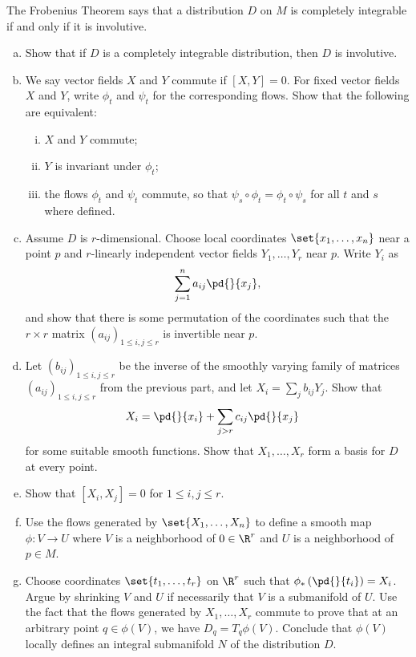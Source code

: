 \documentclass[10pt]{mypackage}
\begin{document}
\begin{problem}[Problem 3]
  The Frobenius Theorem says that a distribution $D$ on $M$ is completely integrable if and only if it is involutive.
  \begin{enumerate}[(a)]
    \item Show that if $D$ is a completely integrable distribution, then $D$ is involutive.
    \item We say vector fields $X$ and $Y$ commute if $ \left[ X,Y \right] = 0 $. For fixed vector fields $X$ and $Y$, write $\phi_t$ and $\psi_t$ for the corresponding flows. Show that the following are equivalent:
      \begin{enumerate}[(i)]
        \item $X$ and $Y$ commute;
        \item $Y$ is invariant under $\phi_t$;
        \item the flows $\phi_t$ and $\psi_t$ commute, so that $\psi_s\circ \phi_t = \phi_t\circ \psi_s$ for all $t$ and $s$ where defined.
      \end{enumerate}
    \item Assume $D$ is $r$-dimensional. Choose local coordinates $\set{x_1,\dots,x_n}$ near a point $p$ and $r$-linearly independent vector fields $Y_1,\dots,Y_r$ near $p$. Write $Y_i$ as
      \begin{align*}
        \sum_{j=1}^{n} a_{ij} \pd{}{x_j},
      \end{align*}
      and show that there is some permutation of the coordinates such that the $r\times r$ matrix $\left( a_{ij} \right)_{1\leq i,j\leq r}$ is invertible near $p$.
    \item Let $\left( b_{ij} \right)_{1\leq i,j\leq r}$ be the inverse of the smoothly varying family of matrices $\left( a_{ij} \right)_{1\leq i,j\leq r}$ from the previous part, and let $X_i = \sum_{j}b_{ij}Y_j$. Show that
      \begin{align*}
        X_i &= \pd{}{x_i} + \sum_{j > r} c_{ij} \pd{}{x_j}
      \end{align*}
      for some suitable smooth functions. Show that $X_1,\dots,X_r$ form a basis for $D$ at every point.
    \item Show that $\left[ X_i,X_j \right] = 0$ for $1\leq i,j\leq r$.
    \item Use the flows generated by $\set{X_1,\dots,X_n}$ to define a smooth map $\phi\colon V\rightarrow U$ where $V$ is a neighborhood of $0\in\R^{r}$ and $U$ is a neighborhood of $p\in M$.
    \item Choose coordinates $\set{t_1,\dots,t_r}$ on $\R^{r}$ such that $\phi_{\ast}\left( \pd{}{t_i} \right) = X_i$. Argue by shrinking $V$ and $U$ if necessarily that $V$ is a submanifold of $U$. Use the fact that the flows generated by $X_1,\dots,X_r$ commute to prove that at an arbitrary point $q\in \phi(V)$, we have $D_q = T_q\phi(V)$. Conclude that $\phi(V)$ locally defines an integral submanifold $N$ of the distribution $D$.
  \end{enumerate}
\end{problem}
\end{document}
